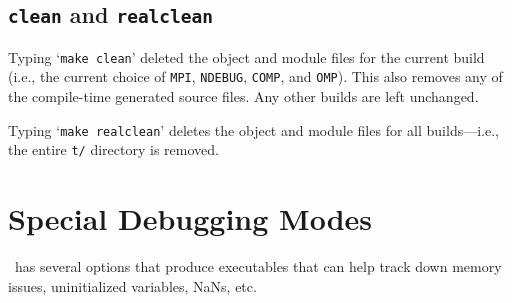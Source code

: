 \subsection{{\tt clean} and {\tt realclean}}

Typing `{\tt make clean}' deleted the object and module files for the
current build (i.e., the current choice of {\tt MPI}, {\tt NDEBUG},
{\tt COMP}, and {\tt OMP}).  This also removes any of the compile-time
generated source files.  Any other builds are left unchanged.

Typing `{\tt make realclean}' deletes the object and module files for
all builds---i.e., the entire {\tt t/} directory is removed.


\section{Special Debugging Modes}

\label{ch:makefiles:special}

\boxlib\ has several options that produce executables that can help
track down memory issues, uninitialized variables, NaNs, etc.

